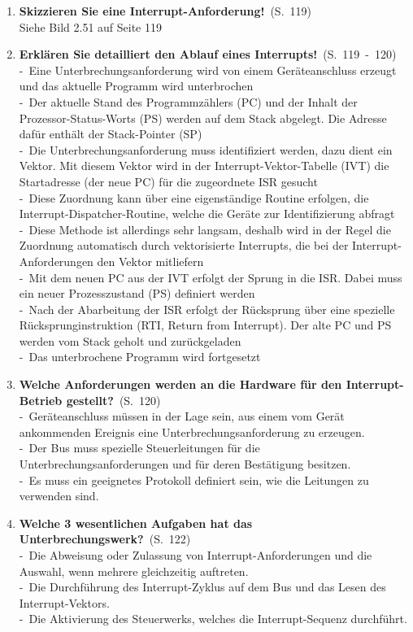 \documentclass[a4paper,12pt]{article}
\newcommand{\question}[3]{\pagebreak[3]\item {\textbf{#1?}}\ (S.\ #2)#3}
\newcommand{\statement}[3]{\pagebreak[3]\item {\textbf{#1!}}\ (S.\ #2)#3}
\newcommand{\catchword}[1]{\\-\ #1}
\newcommand{\normaltext}[1]{\\#1}
\newcommand{\page}[1]{#1}
\newcommand{\pages}[2]{#1\ -\ #2}
\begin{document}
\begin{enumerate}
  \statement{Skizzieren Sie eine Interrupt-Anforderung}{\page{119}}
  {
    \normaltext{Siehe Bild 2.51 auf Seite 119}
  }

  \statement{Erklären Sie detailliert den Ablauf eines Interrupts}{\pages{119}{120}}
  {
    \catchword{Eine Unterbrechungsanforderung wird von einem Geräteanschluss erzeugt
               und das aktuelle Programm wird unterbrochen}
    \catchword{Der aktuelle Stand des Programmzählers (PC) und der Inhalt der
               Prozessor-Status-Worts (PS) werden auf dem Stack abgelegt. Die
               Adresse dafür enthält der Stack-Pointer (SP)}
    \catchword{Die Unterbrechungsanforderung muss identifiziert werden, dazu dient
               ein Vektor. Mit diesem Vektor wird in der Interrupt-Vektor-Tabelle (IVT)
               die Startadresse (der neue PC) für die zugeordnete ISR gesucht}
    \catchword{Diese Zuordnung kann über eine eigenständige Routine erfolgen,
               die Interrupt-Dispatcher-Routine, welche die Geräte zur Identifizierung
               abfragt}
    \catchword{Diese Methode ist allerdings sehr langsam, deshalb wird in der Regel
               die Zuordnung automatisch durch vektorisierte Interrupts, die bei
               der Interrupt-Anforderungen den Vektor mitliefern}
    \catchword{Mit dem neuen PC aus der IVT erfolgt der Sprung in die ISR. Dabei muss
               ein neuer Prozesszustand (PS) definiert werden}
    \catchword{Nach der Abarbeitung der ISR erfolgt der Rücksprung über eine spezielle
               Rücksprunginstruktion (RTI, Return from Interrupt). Der alte PC und
               PS werden vom Stack geholt und zurückgeladen}
    \catchword{Das unterbrochene Programm wird fortgesetzt}
  }

  \question{Welche Anforderungen werden an die Hardware für den Interrupt-Betrieb gestellt}{\page{120}}
  {
    \catchword{Geräteanschluss müssen in der Lage sein, aus einem vom Gerät ankommenden Ereignis eine 
               Unterbrechungsanforderung zu erzeugen.}
    \catchword{Der Bus muss spezielle Steuerleitungen für die Unterbrechungsanforderungen und für deren
               Bestätigung besitzen.}
    \catchword{Es muss ein geeignetes Protokoll definiert sein, wie die Leitungen zu verwenden sind.}
  }

  \question{Welche 3 wesentlichen Aufgaben hat das Unterbrechungswerk}{\page{122}}
  {
    \catchword{Die Abweisung oder Zulassung von Interrupt-Anforderungen und die Auswahl, wenn mehrere
               gleichzeitig auftreten.}
    \catchword{Die Durchführung des Interrupt-Zyklus auf dem Bus und das Lesen des Interrupt-Vektors.}
    \catchword{Die Aktivierung des Steuerwerks, welches die Interrupt-Sequenz durchführt.}
  }


\end{enumerate}
\end{document}
